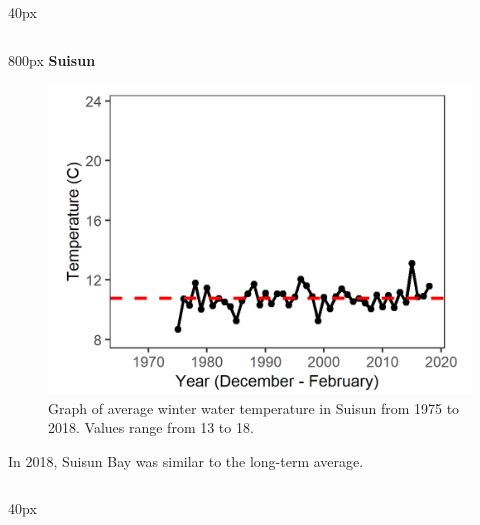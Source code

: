 \documentclass[
]{book}
\begin{document}
\begin{column}{40px\textwidth}
~
\end{column}

\begin{column}{800px\textwidth}
\textbf{Suisun}

\begin{figure}
\includegraphics[width=15.25in]{figures/temp_sswinter} \caption{Graph of average winter water temperature in Suisun from 1975 to 2018. Values range from 13 to 18.}\label{fig:unnamed-chunk-153}
\end{figure}

In 2018, Suisun Bay was similar to the long-term average.
\end{column}

\begin{column}{40px\textwidth}
~
\end{column}
\end{document}
